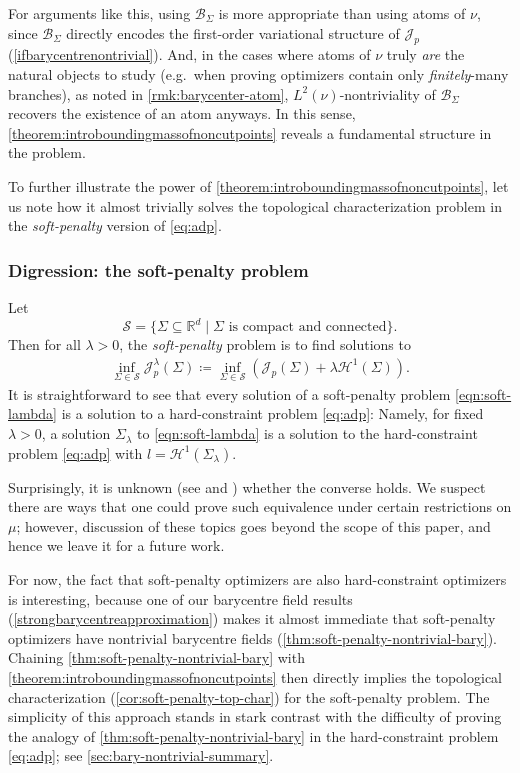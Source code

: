 \documentclass[preprint, reqno]{amsart}
\theoremstyle{definition}
\numberwithin{equation}{section}
\begin{document}
For arguments like this, using $\mathcal B_\Sigma$ is more appropriate
than using atoms of $\nu$, since $\mathcal B_\Sigma$ directly encodes
the first-order variational structure of $\mathscr J_p$
(\cref{ifbarycentrenontrivial}). And, in the cases where atoms of
$\nu$ truly \emph{are} the natural objects to study (e.g.\ when
proving optimizers contain only \emph{finitely}-many branches), as
noted in \cref{rmk:barycenter-atom}, $L^2(\nu)$-nontriviality of
$\mathcal B_\Sigma$ recovers the existence of an atom anyways. In this
sense, \cref{theorem:introboundingmassofnoncutpoints} reveals a
fundamental structure in the problem.

To further illustrate the power of
\cref{theorem:introboundingmassofnoncutpoints}, let us note how it
almost trivially solves the topological characterization problem in
the \emph{soft-penalty} version of \eqref{eq:adp}.


\subsubsection{Digression: the soft-penalty problem}\label{sec:soft-penalty}


Let
\[
  \mathcal S = \{\Sigma \subseteq \mathbb R^d \mid \Sigma \text{ is
    compact and connected}\}.
\]
Then for all $\lambda > 0$, the \emph{soft-penalty} problem is to find
solutions to
\begin{align}\label{eqn:soft-lambda}
  \inf_{\Sigma \in \mathcal S} \mathscr J_p^\lambda(\Sigma) \coloneqq
  \inf_{\Sigma \in \mathcal S} (\mathscr J_p(\Sigma) + \lambda
  \mathcal H^1(\Sigma)).
\end{align}
It is straightforward to see that every solution of a soft-penalty
problem \eqref{eqn:soft-lambda} is a solution to a hard-constraint
problem \eqref{eq:adp}: Namely, for fixed $\lambda > 0$, a solution
$\Sigma_\lambda$ to \eqref{eqn:soft-lambda} is a solution to the
hard-constraint problem \eqref{eq:adp} with
$l=\mathcal{H}^1(\Sigma_\lambda)$.

Surprisingly, it is unknown (see \cite[Remark 22]{Lemenant12} and
\cite[\S 1.7.4]{Kobayashi24}) whether the converse holds. We suspect
there are ways that one could prove such equivalence under certain
restrictions on $\mu$; however, discussion of these topics goes beyond
the scope of this paper, and hence we leave it for a future work.

For now, the fact that soft-penalty optimizers are also
hard-constraint optimizers is interesting, because one of our
barycentre field results (\cref{strongbarycentreapproximation}) makes
it almost immediate that soft-penalty optimizers have nontrivial
barycentre fields (\cref{thm:soft-penalty-nontrivial-bary}). Chaining
\cref{thm:soft-penalty-nontrivial-bary} with
\cref{theorem:introboundingmassofnoncutpoints} then directly implies
the topological characterization (\cref{cor:soft-penalty-top-char})
for the soft-penalty problem. The simplicity of this approach stands
in stark contrast with the difficulty of proving the analogy of
\cref{thm:soft-penalty-nontrivial-bary} in the hard-constraint problem
\eqref{eq:adp}; see \cref{sec:bary-nontrivial-summary}.
\end{document}

